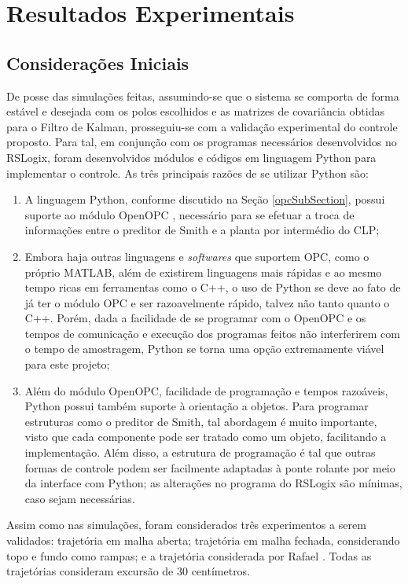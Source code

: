 \section{Resultados Experimentais}
\subsection{Considerações Iniciais}
De posse das simulações feitas, assumindo-se que o sistema se comporta de forma estável e desejada com os polos escolhidos e as matrizes de covariância obtidas para o Filtro de Kalman, prosseguiu-se com a validação experimental do controle proposto. Para tal, em conjunção com os programas necessários desenvolvidos no RSLogix, foram desenvolvidos módulos e códigos em linguagem Python para implementar o controle. As três principais razões de se utilizar Python são:
\begin{enumerate}
\item A linguagem Python, conforme discutido na Seção \ref{opcSubSection}, possui suporte ao módulo OpenOPC \cite{OpenOPC}, necessário para se efetuar a troca de informações entre o preditor de Smith e a planta por intermédio do CLP;
\item Embora haja outras linguagens e \textit{softwares} que suportem OPC, como o próprio MATLAB, além de existirem linguagens mais rápidas e ao mesmo tempo ricas em ferramentas como o C++, o uso de Python se deve ao fato de já ter o módulo OPC e ser razoavelmente rápido, talvez não tanto quanto o C++. Porém, dada a facilidade de se programar com o OpenOPC e os tempos de comunicação e execução dos programas feitos não interferirem com o tempo de amostragem, Python se torna uma opção extremamente viável para este projeto;
\item Além do módulo OpenOPC, facilidade de programação e tempos razoáveis, Python possui também suporte à orientação a objetos. Para programar estruturas como o preditor de Smith, tal abordagem é muito importante, visto que cada componente pode ser tratado como um objeto, facilitando a implementação. Além disso, a estrutura de programação é tal que outras formas de controle podem ser facilmente adaptadas à ponte rolante por meio da interface com Python; as alterações no programa do RSLogix são mínimas, caso sejam necessárias.
\end{enumerate}

Assim como nas simulações, foram considerados três experimentos a serem validados: trajetória em malha aberta; trajetória em malha fechada, considerando topo e fundo como rampas; e a trajetória considerada por Rafael \cite{rafaelMestrado}. Todas as trajetórias consideram excursão de 30 centímetros.

